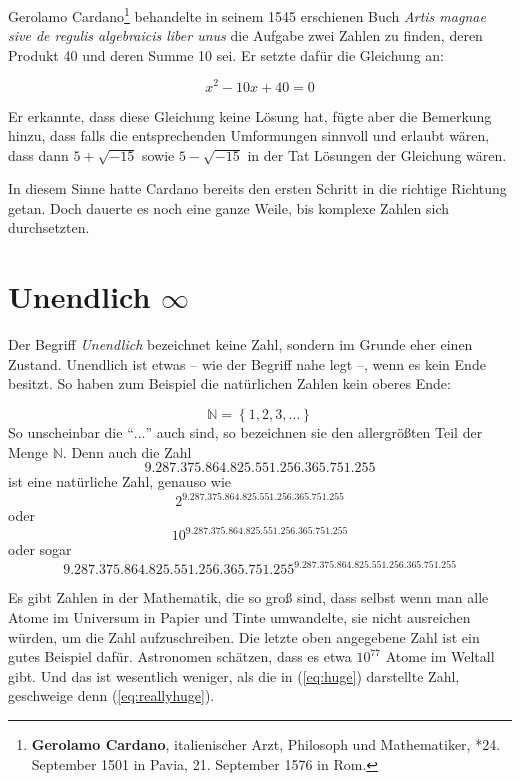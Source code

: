 Gerolamo Cardano\footnote{\textbf{Gerolamo Cardano}, italienischer Arzt, Philosoph und Mathematiker, *24. September 1501 in Pavia, 21. September 1576 in Rom.} behandelte in seinem 1545 erschienen Buch \textit{Artis magnae sive de regulis algebraicis liber unus} die Aufgabe zwei Zahlen zu finden, deren Produkt 40 und deren Summe 10 sei. Er setzte dafür die Gleichung an:

\[ x^2-10x+40=0 \]

Er erkannte, dass diese Gleichung keine Lösung hat, fügte aber die Bemerkung hinzu, dass falls die entsprechenden Umformungen sinnvoll und erlaubt wären, dass dann $5+\sqrt{-15}$ sowie $5-\sqrt{-15} $ in der Tat Lösungen der Gleichung wären. 

In diesem Sinne hatte Cardano bereits den ersten Schritt in die richtige Richtung getan. Doch dauerte es noch eine ganze Weile, bis komplexe Zahlen sich durchsetzten.


\section{Unendlich $\infty$}\label{sec:infty}

Der Begriff \textsl{Unendlich} bezeichnet keine Zahl, sondern im Grunde eher einen Zustand. Unendlich ist etwas -- wie der Begriff nahe legt --, wenn es kein Ende besitzt. So haben zum Beispiel die natürlichen Zahlen kein oberes Ende:

\[
\mathbb{N} = \left\lbrace 1,2,3, \dots \right\rbrace
\]
So unscheinbar die "`$\dots$"' auch sind, so bezeichnen sie den allergrößten Teil der Menge $\mathbb{N}$. Denn auch die Zahl 
\[9.287.375.864.825.551.256.365.751.255\]
ist eine natürliche Zahl, genauso wie 
\[2^{9.287.375.864.825.551.256.365.751.255}\]
oder
\begin{equation} \label{eq:huge}
10^{9.287.375.864.825.551.256.365.751.255}
\end{equation}
oder sogar
\begin{equation}\label{eq:reallyhuge}
9.287.375.864.825.551.256.365.751.255^{9.287.375.864.825.551.256.365.751.255}
\end{equation}

Es gibt Zahlen in der Mathematik, die so groß sind, dass selbst wenn man alle Atome im Universum in Papier und Tinte umwandelte, sie nicht ausreichen würden, um die Zahl aufzuschreiben. Die letzte oben angegebene Zahl ist ein gutes Beispiel dafür. Astronomen schätzen, dass es etwa $10^{77}$ Atome im Weltall gibt. Und das ist wesentlich weniger, als die in (\ref{eq:huge}) darstellte Zahl, geschweige denn (\ref{eq:reallyhuge}).

